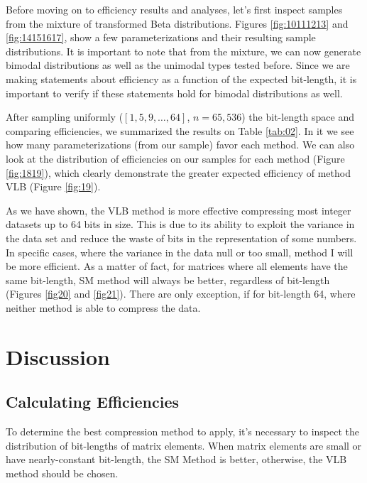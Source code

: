 \documentclass[10pt]{article}
\begin{document}
Before moving on to efficiency results and analyses, let's first inspect samples 
from the mixture of transformed Beta distributions. Figures \ref{fig:10111213} 
and \ref{fig:14151617}, show a few parameterizations and their resulting sample 
distributions. It is important to note that from the mixture, we can now 
generate bimodal distributions as well as the unimodal types tested before. 
Since we are making statements about efficiency as a function of the expected 
bit-length, it is important to verify if these statements hold for bimodal  
distributions as well.

After sampling uniformly ($[1,5,9,\ldots,64]$, $n=65,536$) the bit-length space 
and comparing efficiencies, we summarized the results on Table \ref{tab:02}. In 
it we see how many parameterizations (from our sample) favor each method. We can 
also look at the distribution of efficiencies on our samples for each method 
(Figure \ref{fig:1819}), which clearly demonstrate the greater expected 
efficiency of method VLB (Figure \ref{fig:19}).

As we have shown, the VLB method is more effective compressing most integer 
datasets up to 64 bits in size. This is due to its ability to exploit the 
variance in the data set and reduce the waste of bits in the representation of 
some numbers. In specific cases, where the variance in the data null or too 
small, method I will be more efficient. As a matter of fact, for matrices where 
all elements have the same bit-length, SM method  will always be better, 
regardless of bit-length (Figures \ref{fig20} and \ref{fig21}). There are only 
exception, if for bit-length 64, where neither method is able to compress the 
data. 

\section*{Discussion}

\subsection*{Calculating Efficiencies}

To determine the best compression method to apply, it's necessary to inspect the 
distribution of bit-lengths of matrix elements. When matrix elements are small 
or have nearly-constant bit-length, the SM Method is better, otherwise, the VLB method should be chosen.
\end{document}
